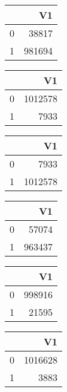 \bigskip\bigskip
\centering
\begin{tabular}{rr}
  \hline
 & V1 \\ 
  \hline
0 & 38817 \\ 
  1 & 981694 \\ 
   \hline
\end{tabular}

\bigskip\bigskip
\centering
\begin{tabular}{rr}
  \hline
 & V1 \\ 
  \hline
0 & 1012578 \\ 
  1 & 7933 \\ 
   \hline
\end{tabular}

\bigskip\bigskip
\centering
\begin{tabular}{rr}
  \hline
 & V1 \\ 
  \hline
0 & 7933 \\ 
  1 & 1012578 \\ 
   \hline
\end{tabular}

\bigskip\bigskip
\centering
\begin{tabular}{rr}
  \hline
 & V1 \\ 
  \hline
0 & 57074 \\ 
  1 & 963437 \\ 
   \hline
\end{tabular}

\bigskip\bigskip
\centering
\begin{tabular}{rr}
  \hline
 & V1 \\ 
  \hline
0 & 998916 \\ 
  1 & 21595 \\ 
   \hline
\end{tabular}

\bigskip\bigskip
\centering
\begin{tabular}{rr}
  \hline
 & V1 \\ 
  \hline
0 & 1016628 \\ 
  1 & 3883 \\ 
   \hline
\end{tabular}

